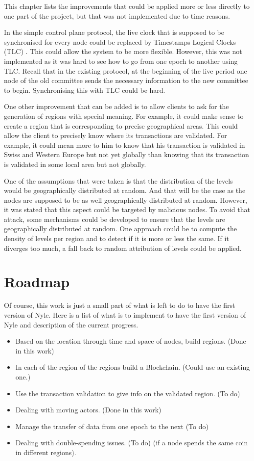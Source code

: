 \documentclass[a4paper,11pt,oneside]{report}
\begin{document}
This chapter lists the improvements that could be applied more or less directly
to one part of the project, but that was not implemented due to time reasons. 

In the simple control plane protocol, the live clock that is supposed to be
synchronised for every node could be replaced by Timestamps Logical Clocks (TLC)
\cite{Ford2019}. This could allow the system to be more flexible.
However, this was not implemented as it was hard to see how to go from one
epoch to another using TLC. Recall that in the existing protocol, at the
beginning of the live period one node of the old committee sends the necessary
information to the new committee to begin. Synchronising this with TLC could be hard.

One other improvement that can be added is to allow clients to ask for the
generation of regions with special meaning. For example, it could make sense to
create a region that is corresponding to precise geographical areas. This could
allow the client to precisely know where its transactions are validated. For
example, it could mean more to him to know that his transaction is validated in
Swiss and Western Europe but not yet globally than knowing that its transaction
is validated in some local area but not globally. 

One of the assumptions that were taken is that the distribution of the levels
would be geographically distributed at random. And that will be the case as the
nodes are supposed to be as well geographically distributed at random.
However, it was stated that this aspect could be targeted by malicious nodes.
To avoid that attack, some mechanisms could be developed to ensure
that the levels are geographically distributed at random. One approach could be
to compute the density of levels per region and to detect if it is more or less
the same. If it diverges too much, a fall back to random attribution of levels
could be applied. 

\section{Roadmap}
Of course, this work is just a small part of what is left to do to have the first
version of Nyle. Here is a list of what is to implement to have the first version
of Nyle and description of the current progress.

\begin{itemize} 
\item Based on the location through time and space of nodes, build regions.
(Done in this work)
\item In each of the region of the regions build a Blockchain. (Could use an
  existing one.)
\item Use the transaction validation to give info on the validated region. (To
do) 
\item Dealing with moving actors. (Done in this work)
\item Manage the transfer of data from one epoch to the next (To do)
\item Dealing with double-spending issues. (To do)
(if a node spends the same coin in different regions). 
\end{itemize}
\end{document}
